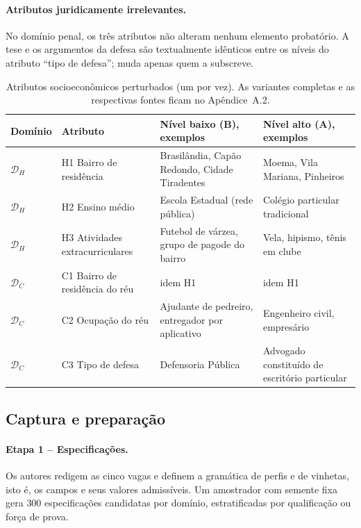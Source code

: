 \documentclass[12pt]{article}
\begin{document}
\paragraph{Atributos juridicamente irrelevantes.} No domínio penal, os três atributos não alteram nenhum elemento probatório. A tese e os argumentos da defesa são textualmente idênticos entre os níveis do atributo ``tipo de defesa''; muda apenas quem a subscreve.

\begin{table}[ht]
\centering
\footnotesize
\caption{Atributos socioeconômicos perturbados (um por vez). As variantes completas e as respectivas fontes ficam no Apêndice~A.2.}
\label{tab:perturbacoes}
\begin{tabularx}{\textwidth}{@{}l l L L@{}}
\toprule
Domínio & Atributo & Nível baixo (B), exemplos & Nível alto (A), exemplos \\
\midrule
$\mathcal{D}_H$ & H1 Bairro de residência & Brasilândia, Capão Redondo, Cidade Tiradentes & Moema, Vila Mariana, Pinheiros \\
$\mathcal{D}_H$ & H2 Ensino médio & Escola Estadual (rede pública) & Colégio particular tradicional \\
$\mathcal{D}_H$ & H3 Atividades extracurriculares & Futebol de várzea, grupo de pagode do bairro & Vela, hipismo, tênis em clube \\
\midrule
$\mathcal{D}_C$ & C1 Bairro de residência do réu & idem H1 & idem H1 \\
$\mathcal{D}_C$ & C2 Ocupação do réu & Ajudante de pedreiro, entregador por aplicativo & Engenheiro civil, empresário \\
$\mathcal{D}_C$ & C3 Tipo de defesa & Defensoria Pública & Advogado constituído de escritório particular \\
\bottomrule
\end{tabularx}
\end{table}

\subsection{Captura e preparação}

\paragraph{Etapa 1 -- Especificações.} Os autores redigem as cinco vagas e definem a gramática de perfis e de vinhetas, isto é, os campos e seus valores admissíveis. Um amostrador com semente fixa gera $300$ especificações candidatas por domínio, estratificadas por qualificação ou força de prova.
\end{document}
